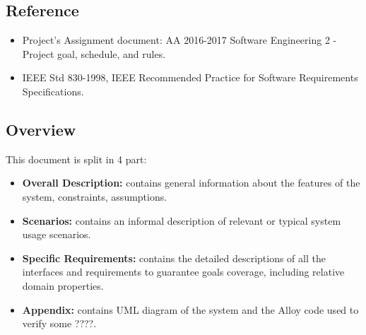 \subsection{Reference}
\begin{itemize}
\item Project's Assignment document: AA 2016-2017 Software Engineering 2 - Project goal, schedule, and rules.
\item IEEE Std 830-1998, IEEE Recommended Practice for Software Requirements Specifications.
\end{itemize}
\subsection{Overview}
This document is split in 4 part:
\begin{itemize}
\item \textbf{Overall Description:} contains general information about the features of the system, constraints, assumptions. 
\item \textbf{Scenarios:} contains an informal description of relevant or typical system usage scenarios.
\item \textbf{Specific Requirements:} contains the detailed descriptions of all the interfaces and requirements to guarantee goals coverage, including relative domain properties. 
\item \textbf{Appendix:} contains UML diagram of the system and the Alloy code used to verify some ????.
\end{itemize}